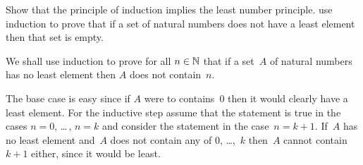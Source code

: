 \documentclass{ibl}
\begin{document}
\begin{ex}
Show that the principle of induction implies the least number 
principle.
\hint
use induction to prove that if a set of natural numbers does not
have a least element then that set is empty.
\begin{ans}
We shall use induction to prove for all $n\in\mathbb{N}$ that if a set~$A$ 
of natural numbers has no
least element then $A$ does not contain~$n$.

The base case is easy since if $A$ were to contains~$0$ then it would
clearly have a least element.
For the inductive step assume that the statement is true in the cases
$n=0$, \ldots\,, $n=k$ and consider the statement in the case~$n=k+1$.
If~$A$ has no least element and~$A$ does not contain any of $0$, \ldots,~$k$ 
then~$A$ cannot contain~$k+1$ either, since it would be least.   
\end{ans}
\end{ex}





\end{document}
